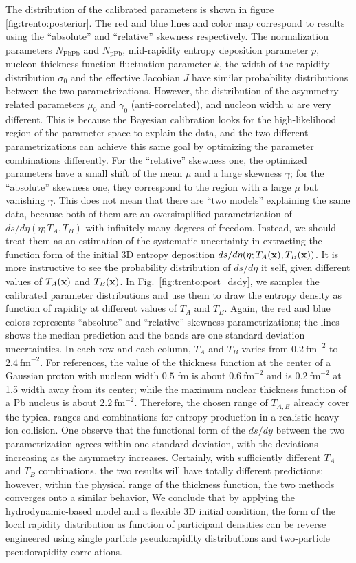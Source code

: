The distribution of the calibrated parameters is shown in figure \ref{fig:trento:posterior}.
The red and blue lines and color map correspond to results using the ``absolute'' and ``relative'' skewness respectively.
The normalization parameters $N_{\textrm{PbPb}}$ and $N_{\textrm{pPb}}$, mid-rapidity entropy deposition parameter $p$, nucleon thickness function fluctuation parameter $k$, the width of the rapidity distribution $\sigma_0$ and the effective Jacobian $J$ have similar probability distributions between the two parametrizations.
However, the distribution of the asymmetry related parameters $\mu_0$ and $\gamma_0$ (anti-correlated), and nucleon width $w$ are very different.
This is because the Bayesian calibration looks for the high-likelihood region of the parameter space to explain the data, and the two different parametrizations can achieve this same goal by optimizing the parameter combinations differently.
For the ``relative'' skewness one, the optimized parameters have a small shift of the mean $\mu$ and a large skewness $\gamma$; for the ``absolute'' skewness one, they correspond to the region with a large $\mu$ but vanishing $\gamma$.
This does not mean that there are ``two models'' explaining the same data, because both of them are an oversimplified parametrization of $ds/d\eta(\eta; T_A, T_B)$ with infinitely many degrees of freedom. 
Instead, we should treat them as an estimation of the systematic uncertainty in extracting the function form of the initial 3D entropy deposition $ds/d\eta(\eta; T_A(\mathbf x), T_B(\mathbf x))$.
It is more instructive to see the probability distribution of $ds/d\eta$ it self, given different values of $T_A(\mathbf x)$ and $T_B(\mathbf x)$.
In Fig.~\ref{fig:trento:post_dsdy}, we samples the calibrated parameter distributions and use them to draw the entropy density as function of rapidity at different values of $T_A$ and $T_B$. 
Again, the red and blue colors represents ``absolute'' and ``relative'' skewness parametrizations; the lines shows the median prediction and the bands are one standard deviation uncertainties. 
In each row and each column, $T_A$ and $T_B$ varies from $0.2~\text{fm}^{-2}$ to $2.4~\text{fm}^{-2}$. 
For references, the value of the thickness function at the center of a Gaussian proton with nucleon width $0.5$ fm is about $0.6~\text{fm}^{-2}$ and is $0.2~\text{fm}^{-2}$  at 1.5 width away from its center; while the maximum nuclear thickness function of a Pb nucleus is about $2.2~\text{fm}^{-2}$.
Therefore, the chosen range of $T_{A,B}$ already cover the typical ranges and combinations for entropy production in a realistic heavy-ion collision.
One observe that the functional form of the $ds/dy$ between the two parametrization agrees within one standard deviation, with the deviations increasing as the asymmetry increases.
Certainly, with sufficiently different $T_A$ and $T_B$ combinations, the two results will have totally different predictions; however, within the physical range of the thickness function, the two methods converges onto a similar behavior,
We conclude that by applying the hydrodynamic-based model and a flexible 3D initial condition, the form of the local rapidity distribution as function of participant densities can be reverse engineered using single particle pseudorapidity distributions and two-particle pseudorapidity correlations.

